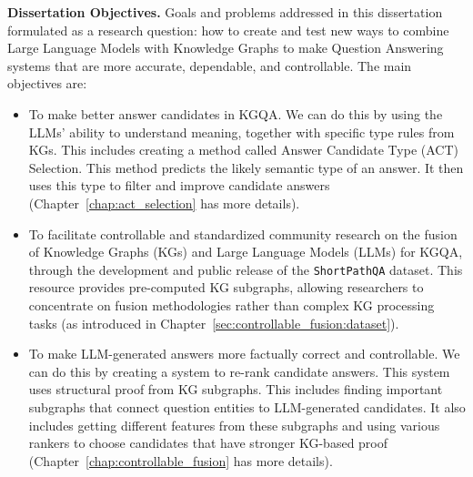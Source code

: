 
\textbf{Dissertation Objectives.}
Goals and problems addressed in this dissertation formulated as a research question: how to create and test new ways to combine Large Language Models with Knowledge Graphs to make Question Answering systems that are more accurate, dependable, and controllable. The main objectives are:
\begin{itemize}
    \item To make better answer candidates in KGQA. We can do this by using the LLMs' ability to understand meaning, together with specific type rules from KGs. This includes creating a method called Answer Candidate Type (ACT) Selection. This method predicts the likely semantic type of an answer. It then uses this type to filter and improve candidate answers (Chapter~\ref{chap:act_selection} has more details).
    \item To facilitate controllable and standardized community research on the fusion of Knowledge Graphs (KGs) and Large Language Models (LLMs) for KGQA, through the development and public release of the \texttt{ShortPathQA} dataset. This resource provides pre-computed KG subgraphs, allowing researchers to concentrate on fusion methodologies rather than complex KG processing tasks (as introduced in Chapter~\ref{sec:controllable_fusion:dataset}).
    \item To make LLM-generated answers more factually correct and controllable. We can do this by creating a system to re-rank candidate answers. This system uses structural proof from KG subgraphs. This includes finding important subgraphs that connect question entities to LLM-generated candidates. It also includes getting different features from these subgraphs and using various rankers to choose candidates that have stronger KG-based proof (Chapter~\ref{chap:controllable_fusion} has more details).
\end{itemize}

